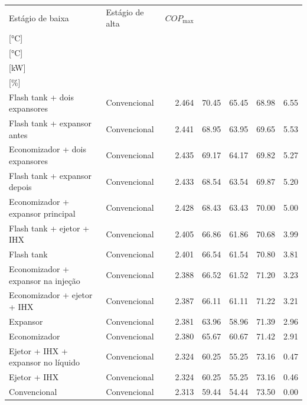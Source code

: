 {\small\setlength{\tabcolsep}{4pt}\renewcommand{\arraystretch}{1.12}
\begin{tabular}{llrrrrr}
\toprule
Estágio de baixa & Estágio de alta & $COP_{\max}$ & \shortstack{$T_{\mathrm{cond,l}}^*$\\{[°C]}} & \shortstack{$T_{\mathrm{evap,h}}^*$\\{[°C]}} & \shortstack{$\dot W_{\mathrm{liq}}$\\{[kW]}} & \shortstack{$\Delta COP_{\mathrm{opt}}$\\{[\%]}} \\
\midrule
Flash tank + dois expansores & Convencional & 2.464 & 70.45 & 65.45 & 68.98 & 6.55 \\
Flash tank + expansor antes & Convencional & 2.441 & 68.95 & 63.95 & 69.65 & 5.53 \\
Economizador + dois expansores & Convencional & 2.435 & 69.17 & 64.17 & 69.82 & 5.27 \\
Flash tank + expansor depois & Convencional & 2.433 & 68.54 & 63.54 & 69.87 & 5.20 \\
Economizador + expansor principal & Convencional & 2.428 & 68.43 & 63.43 & 70.00 & 5.00 \\
Flash tank + ejetor + IHX & Convencional & 2.405 & 66.86 & 61.86 & 70.68 & 3.99 \\
Flash tank & Convencional & 2.401 & 66.54 & 61.54 & 70.80 & 3.81 \\
Economizador + expansor na injeção & Convencional & 2.388 & 66.52 & 61.52 & 71.20 & 3.23 \\
Economizador + ejetor + IHX & Convencional & 2.387 & 66.11 & 61.11 & 71.22 & 3.21 \\
Expansor & Convencional & 2.381 & 63.96 & 58.96 & 71.39 & 2.96 \\
Economizador & Convencional & 2.380 & 65.67 & 60.67 & 71.42 & 2.91 \\
Ejetor + IHX + expansor no líquido & Convencional & 2.324 & 60.25 & 55.25 & 73.16 & 0.47 \\
Ejetor + IHX & Convencional & 2.324 & 60.25 & 55.25 & 73.16 & 0.46 \\
Convencional & Convencional & 2.313 & 59.44 & 54.44 & 73.50 & 0.00 \\
\bottomrule
\end{tabular}
}
